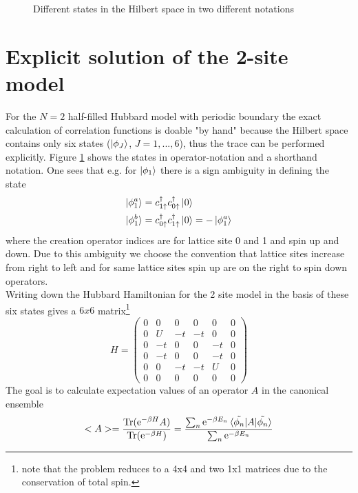 
%
	\begin{figure}[H]
		\centering
		\caption{Different states in the Hilbert space in two different notations}
		\label{fig1}
	\end{figure}
\section{Explicit solution of the 2-site model}
For the $N=2$ half-filled Hubbard model with periodic boundary the exact calculation of correlation functions is doable "by hand" because the Hilbert space contains only six states ($\ket{\phi_J}$, $J=1,...,6$), thus the trace can be performed explicitly. Figure \ref{fig1} shows the states in operator-notation and a shorthand notation. One sees that e.g. for $\ket{\phi_1}$ there is a sign ambiguity in defining the state
\begin{align*}
	\ket{\phi_1^a} &= c^{\dagger}_{1\uparrow}c^{\dagger}_{0\uparrow}\ket{0} \\
	\ket{\phi_1^b} &= c^{\dagger}_{0\uparrow}c^{\dagger}_{1\uparrow}\ket{0} = -\ket{\phi_1^a} 
\end{align*}
where the creation operator indices are for lattice site 0 and 1 and spin up and down. Due to this ambiguity we choose the convention that lattice sites increase from right to left and for same lattice sites spin up are on the right to spin down operators.\\ Writing down the Hubbard Hamiltonian for the 2 site model in the basis of these six states gives a $6x6$ matrix\footnote{note that the problem reduces to a 4x4 and two 1x1 matrices due to the conservation of total spin.}
\begin{equation*}
	H=
\begin{pmatrix}
	0 & 0 & 0&0&0&0\\
	0 & U & -t&-t&0&0\\
	0 & -t & 0&0&-t&0\\
	0 & -t & 0&0&-t&0\\
	0 & 0 & -t&-t&U&0\\
	0 & 0 & 0&0&0&0 
\end{pmatrix}
\end{equation*}
The goal is to calculate expectation values of an operator $A$ in the canonical ensemble
\begin{equation}
	<A> = \frac{\text{Tr}(\text{e}^{-\beta H}A)}{\text{Tr}(\text{e}^{-\beta H})} = \frac{\sum_{n}^{}\text{e}^{-\beta E_n}\braket{\tilde{\phi_n}|A|\tilde{\phi_n}}}{\sum_{n}^{}\text{e}^{-\beta E_n}}\label{expvalue}
\end{equation}

